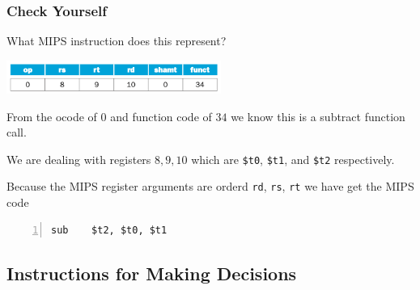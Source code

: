\documentclass[10pt]{article}
\begin{document}
\subsubsection{Check Yourself}
What MIPS instruction does this represent?
\begin{center}
\includegraphics[width=7cm]{15.png}
\end{center}
  \begin{tcolorbox}[%
    enhanced, 
    breakable,
    frame hidden,
    overlay broken = {
      (frame.north west) rectangle (frame.south east);},
    ]
    From the ocode of $0$ and function code of $34$ we know this is a subtract function call.

    We are dealing with registers $8,9,10$ which are \texttt{\$t0}, \texttt{\$t1}, and \texttt{\$t2} respectively.

    Because the MIPS register arguments are orderd \texttt{rd}, \texttt{rs}, \texttt{rt}  we have get the MIPS code
    \begin{lstlisting}[style=CStyle, numbers=left, xleftmargin=5.0ex, aboveskip=2em, belowskip=2em, numberstyle=\color{blue}, escapeinside=||]
sub    $t2, $t0, $t1
\end{lstlisting}

  \end{tcolorbox}
  \addtocounter{subsection}{1}
  \subsection{Instructions for Making Decisions}\label{subsec:}
\end{document}

